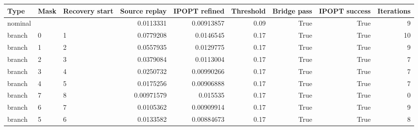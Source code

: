 \begin{tabular}{lllrrrrrr}
\toprule
Type & Mask & Recovery start & Source replay & IPOPT refined & Threshold & Bridge pass & IPOPT success & Iterations \\
\midrule
nominal &  &  & 0.0113331 & 0.00913857 & 0.09 & True & True & 9 \\
branch & 0 & 1 & 0.0779208 & 0.0146545 & 0.17 & True & True & 10 \\
branch & 1 & 2 & 0.0557935 & 0.0129775 & 0.17 & True & True & 9 \\
branch & 2 & 3 & 0.0379084 & 0.0113004 & 0.17 & True & True & 7 \\
branch & 3 & 4 & 0.0250732 & 0.00990266 & 0.17 & True & True & 7 \\
branch & 4 & 5 & 0.0175256 & 0.00906888 & 0.17 & True & True & 7 \\
branch & 7 & 8 & 0.00971579 & 0.015535 & 0.17 & True & True & 0 \\
branch & 6 & 7 & 0.0105362 & 0.00909914 & 0.17 & True & True & 9 \\
branch & 5 & 6 & 0.0133582 & 0.00884673 & 0.17 & True & True & 8 \\
\bottomrule
\end{tabular}
